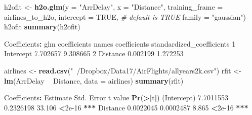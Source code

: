 \documentclass[]{book}
\newenvironment{Shaded}{\begin{snugshade}}{\end{snugshade}}
\newcommand{\KeywordTok}[1]{\textcolor[rgb]{0.13,0.29,0.53}{\textbf{#1}}}
\newcommand{\DataTypeTok}[1]{\textcolor[rgb]{0.13,0.29,0.53}{#1}}
\newcommand{\DecValTok}[1]{\textcolor[rgb]{0.00,0.00,0.81}{#1}}
\newcommand{\FloatTok}[1]{\textcolor[rgb]{0.00,0.00,0.81}{#1}}
\newcommand{\StringTok}[1]{\textcolor[rgb]{0.31,0.60,0.02}{#1}}
\newcommand{\CommentTok}[1]{\textcolor[rgb]{0.56,0.35,0.01}{\textit{#1}}}
\newcommand{\OtherTok}[1]{\textcolor[rgb]{0.56,0.35,0.01}{#1}}
\newcommand{\OperatorTok}[1]{\textcolor[rgb]{0.81,0.36,0.00}{\textbf{#1}}}
\newcommand{\ErrorTok}[1]{\textcolor[rgb]{0.64,0.00,0.00}{\textbf{#1}}}
\newcommand{\NormalTok}[1]{#1}
\theoremstyle{definition}
\theoremstyle{definition}
\theoremstyle{definition}
\theoremstyle{remark}
\begin{document}
\begin{Shaded}
\begin{Highlighting}[]
\NormalTok{h2ofit <-}\StringTok{ }\KeywordTok{h2o.glm}\NormalTok{(}\DataTypeTok{y =} \StringTok{"ArrDelay"}\NormalTok{, }\DataTypeTok{x =} \StringTok{"Distance"}\NormalTok{,}
                  \DataTypeTok{training_frame =}\NormalTok{ airlines_to_h2o,}
                  \DataTypeTok{intercept =} \OtherTok{TRUE}\NormalTok{, }\CommentTok{# default is TRUE}
                  \DataTypeTok{family =} \StringTok{"gaussian"}\NormalTok{)}
\NormalTok{h2ofit}
\KeywordTok{summary}\NormalTok{(h2ofit)}
\end{Highlighting}
\end{Shaded}

\begin{Shaded}
\begin{Highlighting}[]
\NormalTok{Coefficients}\OperatorTok{:}\StringTok{ }\NormalTok{glm coefficients}
\NormalTok{      names coefficients standardized_coefficients}
\DecValTok{1}\NormalTok{ Intercept     }\FloatTok{7.702657}                  \FloatTok{9.308665}
\DecValTok{2}\NormalTok{  Distance     }\FloatTok{0.002199}                  \FloatTok{1.272253}
\end{Highlighting}
\end{Shaded}

\begin{Shaded}
\begin{Highlighting}[]
\NormalTok{airlines <-}\StringTok{ }\KeywordTok{read.csv}\NormalTok{(}\StringTok{"~/Dropbox/Data17/AirFlights/allyears2k.csv"}\NormalTok{)}
\NormalTok{rfit <-}\StringTok{ }\KeywordTok{lm}\NormalTok{(ArrDelay }\OperatorTok{~}\StringTok{ }\NormalTok{Distance, }\DataTypeTok{data =}\NormalTok{ airlines)}
\KeywordTok{summary}\NormalTok{(rfit)}
\end{Highlighting}
\end{Shaded}

\begin{Shaded}
\begin{Highlighting}[]
\NormalTok{Coefficients}\OperatorTok{:}
\StringTok{             }\NormalTok{Estimate Std. Error t value }\KeywordTok{Pr}\NormalTok{(}\OperatorTok{>}\ErrorTok{|}\NormalTok{t}\OperatorTok{|}\NormalTok{)    }
\NormalTok{(Intercept) }\FloatTok{7.7011553}  \FloatTok{0.2326198}  \FloatTok{33.106}   \OperatorTok{<}\FloatTok{2e-16} \OperatorTok{**}\ErrorTok{*}
\NormalTok{Distance    }\FloatTok{0.0022045}  \FloatTok{0.0002487}   \FloatTok{8.865}   \OperatorTok{<}\FloatTok{2e-16} \OperatorTok{**}\ErrorTok{*}
\end{Highlighting}
\end{Shaded}
\end{document}
